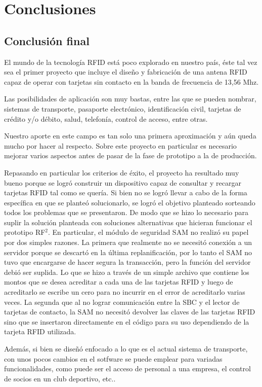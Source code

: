 \chapter{Conclusiones}

\section{Conclusión final}
El mundo de la tecnología RFID está poco explorado en nuestro país, éste 
tal vez sea el primer proyecto que incluye el diseño y fabricación de una 
antena RFID capaz de operar con tarjetas sin contacto en la banda de
frecuencia de 13,56 Mhz.

Las posibilidades de aplicación son muy bastas, entre las que se pueden 
nombrar, sistemas de transporte, pasaporte electrónico, identificación 
civil, tarjetas de crédito y/o débito, salud, telefonía, control de acceso,
entre otras.

Nuestro aporte en este campo es tan solo una primera aproximación y aún 
queda mucho por hacer al respecto. Sobre este proyecto en particular es
necesario mejorar varios aspectos antes de pasar de la fase de prototipo
a la de producción.

Repasando en particular los criterios de éxito, el proyecto ha resultado muy bueno porque se logró construir un dispositivo capaz de consultar y recargar tarjetas RFID tal como se quería. Si bien no se logró llevar a cabo de la forma específica en que se planteó solucionarlo, se logró el objetivo planteado sorteando todos los problemas que se presentaron. De modo que se hizo lo necesario para suplir la solución planteada con soluciones alternativas que hicieran funcionar el prototipo RF$^{2}$. En particular, el módulo de seguridad SAM no realizó su papel por dos simples razones. La primera que realmente no se necesitó conexión a un servidor porque se descartó en la última replanificación, por lo tanto el SAM no tuvo que encargarse de hacer segura la transacción, pero la función del servidor debió ser suplida. Lo que se hizo a través de un simple archivo que contiene los montos que se desea acreditar a cada una de las tarjetas RFID y luego de acreditarlo se escribe un cero para no incurrir en el error de acreditarlo varias veces. La segunda que al no lograr comunicación entre la SBC y el lector de tarjetas de contacto, la SAM no necesitó devolver las claves de las tarjetas RFID sino que se insertaron directamente en el código para su uso dependiendo de la tarjeta RFID utilizada.

Además, si bien se diseñó enfocado a lo que es el actual sistema de transporte, con unos pocos cambios en el sotfware se puede emplear para variadas funcionalidades, como puede ser el acceso de personal a una empresa, el control de socios en un club deportivo, etc..

